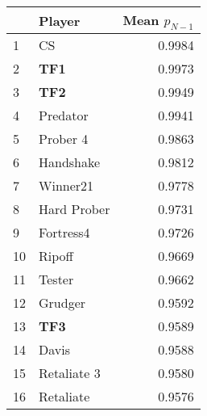 \begin{tabular}{llr}
\toprule
{} &       Player &  Mean $p_{N-1}$ \\
\midrule
1  &           CS &          0.9984 \\
2  &          \textbf{TF1} &          0.9973 \\
3  &          \textbf{TF2} &          0.9949 \\
4  &     Predator &          0.9941 \\
5  &     Prober 4 &          0.9863 \\
6  &    Handshake &          0.9812 \\
7  &     Winner21 &          0.9778 \\
8  &  Hard Prober &          0.9731 \\
9  &    Fortress4 &          0.9726 \\
10 &       Ripoff &          0.9669 \\
11 &       Tester &          0.9662 \\
12 &      Grudger &          0.9592 \\
13 &          \textbf{TF3} &          0.9589 \\
14 &        Davis &          0.9588 \\
15 &  Retaliate 3 &          0.9580 \\
16 &    Retaliate &          0.9576 \\
\bottomrule
\end{tabular}
